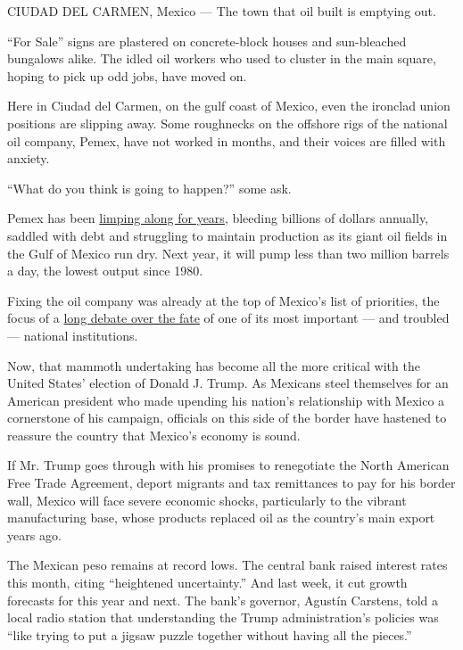 CIUDAD DEL CARMEN, Mexico --- The town that oil built is emptying out.

``For Sale'' signs are plastered on concrete-block houses and
sun-bleached bungalows alike. The idled oil workers who used to cluster
in the main square, hoping to pick up odd jobs, have moved on.

Here in Ciudad del Carmen, on the gulf coast of Mexico, even the
ironclad union positions are slipping away. Some roughnecks on the
offshore rigs of the national oil company, Pemex, have not worked in
months, and their voices are filled with anxiety.

``What do you think is going to happen?'' some ask.

Pemex has been
\href{http://www.nytimes.com/2013/12/13/world/americas/mexico-oil.html}{limping
along for years}, bleeding billions of dollars annually, saddled with
debt and struggling to maintain production as its giant oil fields in
the Gulf of Mexico run dry. Next year, it will pump less than two
million barrels a day, the lowest output since 1980.

Fixing the oil company was already at the top of Mexico's list of
priorities, the focus of a
\href{http://www.nytimes.com/2013/12/13/world/americas/mexico-oil.html}{long
debate over the fate} of one of its most important --- and troubled ---
national institutions.

Now, that mammoth undertaking has become all the more critical with the
United States' election of Donald J. Trump. As Mexicans steel themselves
for an American president who made upending his nation's relationship
with Mexico a cornerstone of his campaign, officials on this side of the
border have hastened to reassure the country that Mexico's economy is
sound.

If Mr. Trump goes through with his promises to renegotiate the North
American Free Trade Agreement, deport migrants and tax remittances to
pay for his border wall, Mexico will face severe economic shocks,
particularly to the vibrant manufacturing base, whose products replaced
oil as the country's main export years ago.

The Mexican peso remains at record lows. The central bank raised
interest rates this month, citing ``heightened uncertainty.'' And last
week, it cut growth forecasts for this year and next. The bank's
governor, Agustín Carstens, told a local radio station that
understanding the Trump administration's policies was ``like trying to
put a jigsaw puzzle together without having all the pieces.''

